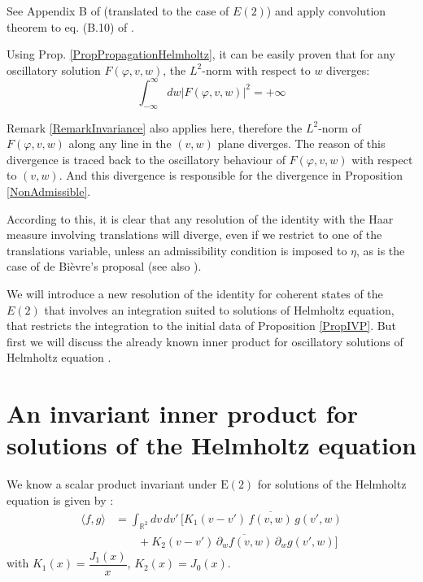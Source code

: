 \documentclass[11pt]{article}
\newcommand{\R}{\mathbb{R}}
\newcommand{\E}{\mathrm{E}}
\newcommand{\conj}[1]{\overline{#1}}
\begin{document}
\noindent{} See Appendix B of \cite{SphereMomentum20} (translated to the case of $E(2)$) and apply convolution theorem to eq. (B.10) of \cite{SphereMomentum20}.


Using Prop. \ref{PropPropagationHelmholtz}, it can be easily proven that for any oscillatory solution $F(\varphi,v,w)$, the $L^2$-norm  with respect to $w$ diverges:
%
\begin{equation}
\int_{-\infty}^\infty dw |F(\varphi,v,w)|^2 =+\infty
\end{equation}

Remark \ref{RemarkInvariance} also applies here, therefore the $L^2$-norm of $F(\varphi,v,w)$
along any line in the $(v,w)$ plane diverges. The reason of this divergence is traced back to the oscillatory behaviour of $F(\varphi,v,w)$ with respect to $(v,w)$. And this divergence is responsible for the divergence in Proposition \ref{NonAdmissible}.

According to this, it is clear that any resolution of the identity with the Haar measure involving translations will diverge, even if we restrict to one of the translations variable, unless an admissibility condition is imposed to $\eta$, as is the case  of de Bi\`evre's proposal \cite{DeBievre89}  (see also  \cite{Torresani95}).

We will introduce a new resolution of the identity for coherent states of the $E(2)$ that involves an integration suited to solutions of Helmholtz equation, that restricts the integration to the initial data of Proposition \ref{PropIVP}. But first we will discuss the already known inner product for oscillatory solutions of Helmholtz equation \cite{Wolf81}.



\section{An invariant inner product for solutions of the Helmholtz equation}

We know  a scalar product invariant under $\E(2)$ for solutions of the
Helmholtz equation is given by \cite{Wolf81}:
\begin{eqnarray}
  \langle f,g\rangle
  &=\int_{\R^2}dv\,dv'\,\Big[
    K_1(v-v')\,\conj{f(v,w)}\,g(v',w)\nonumber\\
  &\qquad+K_2(v-v')\,\conj{\partial_w f(v,w)}\,\partial_w g(v',w)\Big]
\end{eqnarray}
%
with  $K_1(x)=\dfrac{J_1(x)}{x}$, \quad $K_2(x)=J_0(x)$.
\end{document}
